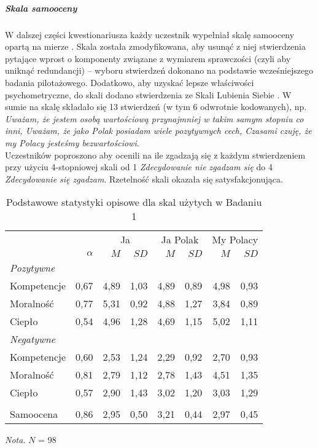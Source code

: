 \documentclass[man]{apa6}
\begin{document}
\subparagraph{Skala samooceny}
W dalszej części kwestionariusza każdy uczestnik wypełniał skalę samooceny opartą na mierze \textcite{rosenberg1965society}. Skala została zmodyfikowana, aby usunąć z niej stwierdzenia pytające wprost o komponenty związane z wymiarem sprawczości (czyli aby uniknąć redundancji) -- wyboru stwierdzeń dokonano na podstawie wcześniejszego badania pilotażowego. Dodatkowo, aby uzyskać lepsze właściwości psychometryczne, do skali dodano stwierdzenia ze Skali Lubienia Siebie \textcite{tafarodi2001two}. W sumie na skalę składało się 13 stwierdzeń (w tym 6 odwrotnie kodowanych), np. \emph{Uważam, że jestem osobą wartościową przynajmniej w takim samym stopniu co inni, Uważam, że jako Polak posiadam wiele pozytywnych cech, Czasami czuję, że my Polacy jesteśmy bezwartościowi}.\\

Uczestników poproszono aby ocenili na ile zgadzają się z każdym stwierdzeniem przy użyciu 4-stopniowej skali od 1 \emph{Zdecydowanie nie zgadzam się} do 4 \emph{Zdecydowanie się zgadzam}. Rzetelność skali okazała się satysfakcjonująca. \\

\begin{table*}[htbp]
\vspace*{2em}
\centering
\begin{threeparttable}
\caption{Podstawowe statystyki opisowe dla skal użytych w Badaniu 1}
\label{tab:0}
\begin{tabular}{lrrrrrrr}
\midrule
\multicolumn{2}{c}{ } & \multicolumn{2}{c}{Ja} & \multicolumn{2}{c}{Ja Polak} & \multicolumn{2}{c}{My Polacy} \\
\cline{3-4}\cline{5-8}
            & $\alpha$ & $M$ & $SD$ & $M$ & $SD$ & $M$ & $SD$ \\
\midrule
\emph{Pozytywne} \\
Kompetencje & 0,67 & 4,89 & 1,03 & 4,89 & 0,89 & 4,98 & 0,93 \\
Moralność   & 0,77 & 5,31 & 0,92 & 4,88 & 1,27 & 3,84 & 0,89 \\
Ciepło      & 0,54 & 4,96 & 1,28 & 4,69 & 1,15 & 5,02 & 1,11 \\
\emph{Negatywne} \\
Kompetencje & 0,60 & 2,53 & 1,24 & 2,29 & 0,92 & 2,70 & 0,93 \\
Moralność   & 0,81 & 2,79 & 1,12 & 2,78 & 1,43 & 4,51 & 1,35 \\
Ciepło      & 0,57 & 2,90 & 1,43 & 3,02 & 1,20 & 3,03 & 1,29 \\
\\
Samoocena & 0,86 & 2,95 & 0,50 & 3,21 & 0,44 & 2,97 & 0,45 \\
\midrule
\end{tabular}

\begin{tablenotes}
{\small
\textit{Nota.} $N$ = 98
}
\end{tablenotes}
\end{threeparttable}

\end{table*}
\end{document}
